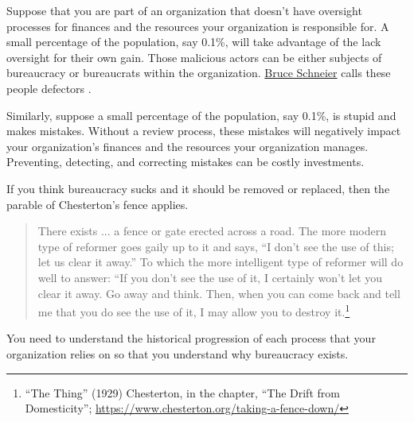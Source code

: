 Suppose that you are part of an organization that doesn't have oversight processes for finances and the resources your organization is responsible for. A small percentage of the population, say 0.1\%, will take advantage of the lack oversight for their own gain. Those malicious actors can be either subjects of bureaucracy or bureaucrats within the organization. \href{https://en.wikipedia.org/wiki/Bruce_Schneier}{Bruce Schneier} calls these people defectors \cite{2012_Schneier}.

Similarly, suppose a small percentage of the population, say 0.1\%, is stupid and makes mistakes. Without a review process, these mistakes will negatively impact your organization's finances and the resources your organization manages. Preventing, detecting, and correcting mistakes can be costly investments. 

If you think bureaucracy sucks and it should be removed or replaced, then the parable of Chesterton's fence applies. 
\begin{quote}
There exists ... a fence or gate erected across a road. The more modern type of reformer goes gaily up to it and says, “I don’t see the use of this; let us clear it away.” To which the more intelligent type of reformer will do well to answer: “If you don’t see the use of it, I certainly won’t let you clear it away. Go away and think. Then, when you can come back and tell me that you do see the use of it, I may allow you to destroy it.\footnote{``The Thing'' (1929) Chesterton, in the chapter, ``The Drift from Domesticity''; \href{https://www.chesterton.org/taking-a-fence-down/}{https://www.chesterton.org/taking-a-fence-down/}}
\end{quote}
You need to understand the historical progression of each process that your organization relies on so that you understand why bureaucracy exists.

